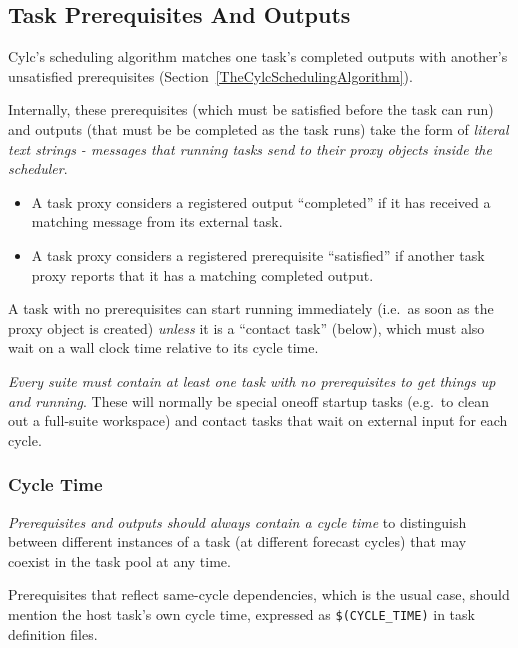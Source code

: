 \documentclass[11pt,a4paper]{article}
\begin{document}
\subsection{Task Prerequisites And Outputs}
\label{TaskPrerequisitesAndOutputs}

Cylc's scheduling algorithm matches one task's completed outputs with
another's unsatisfied prerequisites
(Section~\ref{TheCylcSchedulingAlgorithm}).  

Internally, these prerequisites (which must be satisfied before the task
can run) and outputs (that must be be completed as the task runs) take
the form of {\em literal text strings - messages that running tasks 
send to their proxy objects inside the scheduler}.

\begin{itemize}
    \item A task proxy considers a registered output ``completed''
        if it has received a matching message from its external task.

    \item A task proxy considers a registered prerequisite ``satisfied''
        if another task proxy reports that it has a matching completed
        output.

\end{itemize}

A task with no prerequisites can start running immediately (i.e.\ as soon
as the proxy object is created) {\em unless} it is a ``contact task''
(below), which must also wait on a wall clock time relative to its cycle time.

{\em Every suite must contain at least one task with no prerequisites
to get things up and running}. These will normally be special oneoff
startup tasks (e.g.\ to clean out a full-suite workspace) and contact
tasks that wait on external input for each cycle.


\lstset{language=cylctaskdef} 

\subsubsection{Cycle Time}

{\em Prerequisites and outputs should always contain a cycle time} to
distinguish between different instances of a task (at different 
forecast cycles) that may coexist in the task pool at any time. 

Prerequisites that reflect same-cycle dependencies, which is the usual
case, should mention the host task's own cycle time, expressed as
\lstinline=$(CYCLE_TIME)= in task definition files.
\end{document}
